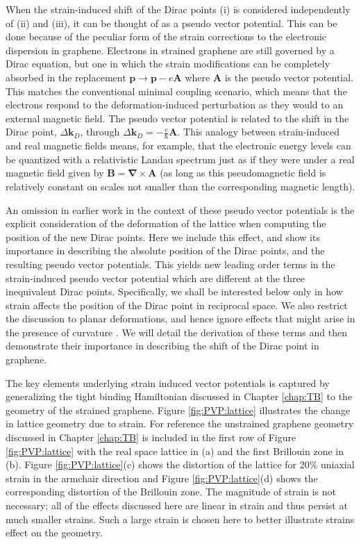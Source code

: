 When the strain-induced shift of the Dirac points (i) is considered independently of (ii) and (iii), it can be thought of as a pseudo vector potential\cite{Sasaki2005,Ando2006,Manes2007,CastroNeto2009,Vozmediano2010}.
This can be done because of the peculiar form of the strain corrections to the electronic dispersion in graphene.
Electrons in strained graphene are still governed by a Dirac equation, but one in which the strain modifications can be completely absorbed in the replacement $\bm{p} \to \bm{p}-e\bm{A}$ where $\bm{A}$ is the pseudo vector potential.
This matches the conventional minimal coupling scenario, which means that the electrons respond to the deformation-induced perturbation as they would to an external magnetic field.  
The pseudo vector potential is related to the shift in the Dirac point, $\Delta \bm{k}_D$, through $\Delta \bm{k}_D=-\frac{e}{\hbar} \bm{A}$.
This analogy between strain-induced and real magnetic fields means, for example, that the electronic energy levels can be quantized with a relativistic Landau spectrum just as if they were under a real magnetic field given by $\bm{B}=\bm{\nabla}\times\bm{A}$ (as long as this pseudomagnetic field is relatively constant on scales not smaller than the corresponding magnetic length)\cite{CastroNeto2009}.

An omission in earlier work in the context of these pseudo vector potentials is the explicit consideration of the deformation of the lattice when computing the position of the new Dirac points.
Here we include this effect, and show its importance in describing the absolute position of the Dirac points, and the resulting pseudo vector potentials.
This yields new leading order terms in the strain-induced pseudo vector potential which are different at the three inequivalent Dirac points.
Specifically, we shall be interested below only in how strain affects the position of the Dirac point in reciprocal space.
We also restrict the discussion to planar deformations, and hence ignore effects that might arise in the presence of curvature \cite{CastroNeto2009,Vozmediano2010}.
We will detail the derivation of these terms and then demonstrate their importance in describing the shift of the Dirac point in graphene.

The key elements underlying strain induced vector potentials is captured by generalizing the tight binding Hamiltonian discussed in Chapter \ref{chap:TB} to the geometry of the strained graphene.
Figure \ref{fig:PVP:lattice} illustrates the change in lattice geometry due to strain.
For reference the unstrained graphene geometry discussed in Chapter \ref{chap:TB} is included in the first row of Figure \ref{fig:PVP:lattice} with the real space lattice in (a) and the first Brillouin zone in (b).
Figure \ref{fig:PVP:lattice}(c) shows the distortion of the lattice for 20\% uniaxial strain in the armchair direction and Figure \ref{fig:PVP:lattice}(d) shows the corresponding distortion of the Brillouin zone.
The magnitude of strain is not necessary; all of the effects discussed here are linear in strain and thus persist at much smaller strains.
Such a large strain is chosen here to better illustrate strains effect on the geometry.

